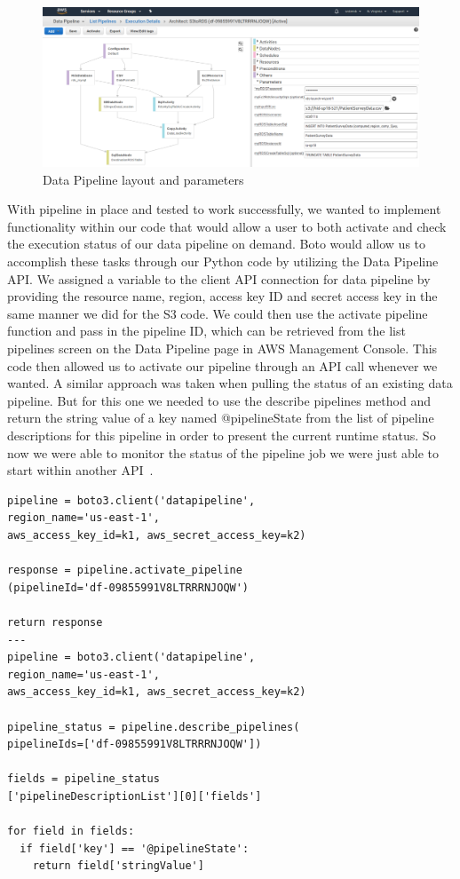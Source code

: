 \begin{figure}[!ht]
  \centering\includegraphics[width=\columnwidth]{images/datapipeline.png}
  \caption{Data Pipeline layout and parameters}\label{f:datapipeline}
\end{figure} 

With pipeline in place and tested to work successfully, we wanted to implement 
functionality within our code that would allow a user to both activate and 
check the execution status of our data pipeline on demand.  Boto would allow 
us to accomplish these tasks through our Python code by utilizing the Data 
Pipeline API. We assigned a variable to the client API connection for data 
pipeline by providing the resource name, region, access key ID and secret 
access key in the same manner we did for the S3 code. We could then use the 
activate pipeline function and pass in the pipeline ID, which can be retrieved 
from the list pipelines screen on the Data Pipeline page in AWS Management 
Console. This code then allowed us to activate our pipeline through an API 
call whenever we wanted. A similar approach was taken when pulling the status 
of an existing data pipeline. But for this one we needed to use the 
describe pipelines method and return the string value of a key named 
@pipelineState from the list of pipeline descriptions for this pipeline in 
order to present the current runtime status. So now we were able to monitor 
the status of the pipeline job we were just able to start within another 
API~\cite{hid-sp18-521-botodatapipeline}.  

\begin{verbatim}
pipeline = boto3.client('datapipeline',
region_name='us-east-1', 
aws_access_key_id=k1, aws_secret_access_key=k2)

response = pipeline.activate_pipeline
(pipelineId='df-09855991V8LTRRRNJOQW')

return response
---
pipeline = boto3.client('datapipeline',
region_name='us-east-1', 
aws_access_key_id=k1, aws_secret_access_key=k2)

pipeline_status = pipeline.describe_pipelines(
pipelineIds=['df-09855991V8LTRRRNJOQW'])

fields = pipeline_status
['pipelineDescriptionList'][0]['fields']

for field in fields:
  if field['key'] == '@pipelineState':
    return field['stringValue']
\end{verbatim}

